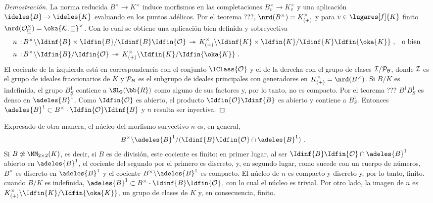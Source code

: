 \begin{proof}[Demostraci\'{o}n]
	La norma reducida $B^{\times}\rightarrow K^{\times}$ induce morfismos
	en las completaciones $B_{v}^{\times}\rightarrow K_{v}^{\times}$ y
	una aplicaci\'{o}n $\ideles{B}\rightarrow\ideles{K}$ evaluando en
	los puntos ad\'{e}licos. Por el teorema ???,
	$\nrd(B^{\times})=K_{(+)}^{\times}$ y para $v\in\lugares[f]{K}$
	finito $\nrd(\cal{O}_{v}^{\times})=\oka{K,v}^{\times}$. Con lo
	cual se obtiene una aplicaci\'{o}n bien definida y sobreyectiva
	\begin{align*}
		n\,:\, & B^{\times}\backslash
		\Idinf{B}\times\Idfin{B}/\Idinf{B}\Idfin{\cal{O}}
		\,\twoheadrightarrow\,
		K_{(+)}^{\times}\backslash
		\Idinf{K}\times\Idfin{K}/\Idinf{K}\Idfin{\oka{K}}
		\text{ ,}\quad\text{o bien} \\
		n\,:\, & B^{\times}\backslash\Idfin{B}/\Idfin{\cal{O}}
		\,\twoheadrightarrow\,
		K_{(+)}^{\times}\backslash\Idfin{K}/\Idfin{\oka{K}}
		\text{ .}
	\end{align*}
	El cociente de la izquierda est\'{a} en correspondencia con el
	conjunto $\lClass{\cal{O}}$ y el de la derecha con el grupo de
	clases $\cal{I}/\cal{P}_{B}$, donde $\cal{I}$
	es el grupo de ideales fraccionarios de $K$ y $\cal{P}_{B}$ es el
	subgrupo de ideales principales con generadores en
	$K_{(+)}^{\times}=\nrd(B^{\times})$.
	Si $B/K$ es indefinida, el grupo $B_{S}^{1}$ contiene a
	$\SL_{2}(\bb{R})$ como alguno de sus factores y, por lo tanto,
	no es compacto. Por el teorema ??? $B^{1}B_{S}^{1}$ es denso
	en $\adeles{B}^{1}$. Como $\Idfin{\cal{O}}$ es abierto, el producto
	$\Idfin{\cal{O}}\Idinf{B}$ es abierto y contiene a $B_{S}^{1}$.
	Entonces
	$\adeles{B}^{1}\subset B^{\times}\cdot\Idfin{\cal{O}}\Idinf{B}$
	y $n$ resulta ser inyectiva.
\end{proof}

Expresado de otra manera, el n\'{u}cleo del morfismo suryectivo $n$ es,
en general,
\begin{align*}
	& B^{\times}\backslash
	\adeles{B}^{1}/(\Idinf{B}\Idfin{\cal{O}}\cap\adeles{B}^{1})
	\text{ .}
\end{align*}
%
Si $B\not\simeq\MM_{2\times 2}(K)$, es decir, si $B$ es de divisi\'{o}n,
este cociente es finito: en primer lugar, al ser
$\Idinf{B}\Idfin{\cal{O}}\cap\adeles{B}^{1}$ abierto en $\adeles{B}^{1}$,
el cociente del segundo por el primero es discreto, y, en segundo lugar,
como sucede con un cuerpo de n\'{u}meros, $B^{\times}$ es discreto en
$\adeles{B}^{1}$ y el cociente $B^{\times}\backslash\adeles{B}^{1}$ es
compacto. El n\'{u}cleo de $n$ es compacto y discreto y, por lo tanto,
finito. cuando $B/K$ es indefinida,
$\adeles{B}^{1}\subset B^{\times}\cdot\Idinf{B}\Idfin{\cal{O}}$, con lo
cual el n\'{u}cleo es trivial. Por otro lado, la imagen de $n$ es
$K_{(+)}^{\times}\backslash\Idfin{K}/\Idfin{\oka{K}}$, un grupo de clases
de $K$ y, en consecuencia, finito.

